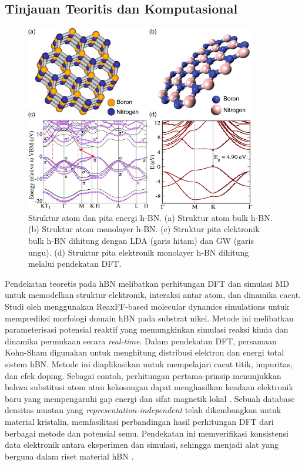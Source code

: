 \subsection{Tinjauan Teoritis dan Komputasional}
\begin{figure}[htbp]
  \centering
  \includegraphics[width=0.9\textwidth]{gambar/referensi_band_plot.jpeg}
  \caption{Struktur atom dan pita energi h‑BN. 
    (a) Struktur atom bulk h‑BN. 
    (b) Struktur atom monolayer h‑BN. 
    (c) Struktur pita elektronik bulk h‑BN dihitung dengan LDA (garis hitam) dan GW (garis ungu). 
    (d) Struktur pita elektronik monolayer h‑BN dihitung melalui pendekatan DFT. \cite{Zhang2020}}
  \label{fig:hbn_atomic_band_structure}
\end{figure}

Pendekatan teoretis pada hBN melibatkan perhitungan DFT dan simulasi MD untuk memodelkan struktur elektronik, interaksi antar atom, dan dinamika cacat.
Studi oleh \cite{Lele2022} menggunakan ReaxFF-based molecular dynamics simulations untuk memprediksi morfologi domain hBN pada substrat nikel.
Metode ini melibatkan parameterisasi potensial reaktif yang memungkinkan simulasi reaksi kimia dan dinamika permukaan secara \emph{real-time}.
Dalam pendekatan DFT, persamaan Kohn-Sham digunakan untuk menghitung distribusi elektron dan energi total sistem hBN.
Metode ini diaplikasikan untuk mempelajari cacat titik, impuritas, dan efek doping.
Sebagai contoh, perhitungan pertama-prinsip menunjukkan bahwa substitusi atom atau kekosongan dapat menghasilkan keadaan elektronik baru yang mempengaruhi gap energi dan sifat magnetik lokal \cite{Zhang2020}.
Sebuah database densitas muatan yang \emph{representation-independent} telah dikembangkan untuk material kristalin, memfasilitasi perbandingan hasil perhitungan DFT dari berbagai metode dan potensial semu.
Pendekatan ini memverifikasi konsistensi data elektronik antara eksperimen dan simulasi, sehingga menjadi alat yang berguna dalam riset material hBN \cite{Shen2022}.


